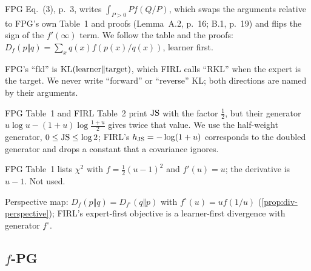 \begin{description}[style=nextline,leftmargin=1.2cm,font=\normalfont\sffamily]
\item[D1] FPG Eq.~(3), p.~3, writes $\int_{P>0}Pf(Q/P)$, which swaps the arguments relative to FPG's own Table~1 and proofs (Lemma~A.2, p.~16; B.1, p.~19) and flips the sign of the $f'(\infty)$ term. We follow the table and the proofs: $D_f(p\Vert q)=\sum_xq(x)f(p(x)/q(x))$, learner first.
\item[D2] FPG's ``fkl'' is $\mathrm{KL}(\text{learner}\Vert\text{target})$, which FIRL calls ``RKL'' when the expert is the target. We never write ``forward'' or ``reverse'' KL; both directions are named by their arguments.
\item[D3] FPG Table~1 and FIRL Table~2 print $\mathrm{JS}$ with the factor $\frac12$, but their generator $u\log u-(1+u)\log\frac{1+u}2$ gives twice that value. We use the half-weight generator, $0\le\mathrm{JS}\le\log2$; FIRL's $h_{\mathrm{JS}}=-\log(1+u)$ corresponds to the doubled generator and drops a constant that a covariance ignores.
\item[D4] FPG Table~1 lists $\chi^2$ with $f=\frac12(u-1)^2$ and $f'(u)=u$; the derivative is $u-1$. Not used.
\item[D5] Perspective map: $D_f(p\Vert q)=D_{f^\circ}(q\Vert p)$ with $f^\circ(u)=uf(1/u)$ (\cref{prop:div-perspective}); FIRL's expert-first objective is a learner-first divergence with generator $f^\circ$.
\end{description}

\subsection{\texorpdfstring{$f$}{f}-PG}

